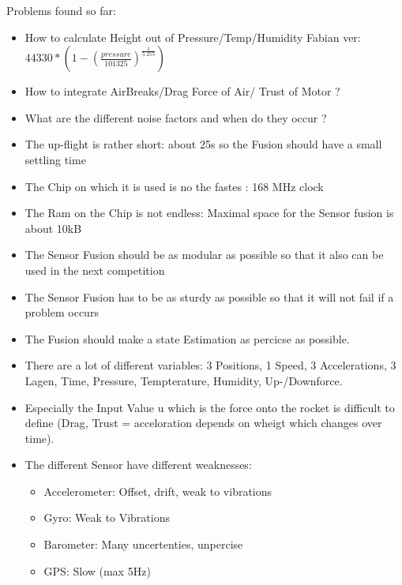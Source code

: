  Problems found so far:
 \begin{itemize}
  \item How to calculate Height out of Pressure/Temp/Humidity Fabian ver: $44330 * (1 - (\frac{pressure}{101325})^{ \frac{1}{5.255}})$
  \item How to integrate AirBreaks/Drag Force of Air/ Trust of Motor ?
  \item What are the different noise factors and when do they occur ?
  \item The up-flight is rather short: about 25s so the Fusion should have a small settling time
  \item The Chip on which it is used is no the fastes : 168 MHz clock
  \item The Ram on the Chip is not endless: Maximal space for the Sensor fusion is about 10kB
  \item The Sensor Fusion should be as modular as possible so that it also can be used in the next competition
  \item The Sensor Fusion has to be as sturdy as possible so that it will not fail if a problem occurs
  \item The Fusion should make a state Estimation as percicse as possible.
  \item There are a lot of different variables: 3 Positions, 1 Speed, 3 Accelerations, 3 Lagen, Time, Pressure, Tempterature, Humidity, Up-/Downforce.
  \item Especially the Input Value u which is the force onto the rocket is difficult to define (Drag, Trust = acceloration depends on wheigt which changes over time).
  \item The different Sensor have different weaknesses: \begin{itemize}
							 \item Accelerometer: Offset, drift, weak to vibrations
                                                         \item Gyro: Weak to Vibrations
                                                         \item Barometer: Many uncertenties, unpercise
                                                         \item GPS: Slow (max 5Hz)
                                                        \end{itemize}
                                                        
								  
 \end{itemize}

